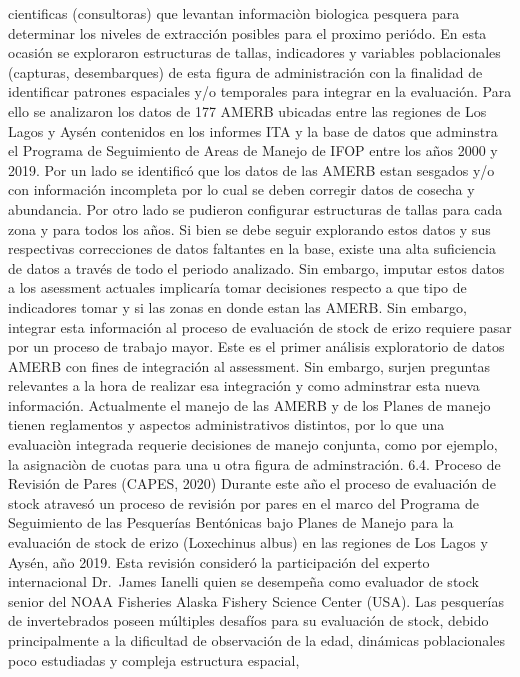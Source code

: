 \documentclass[
]{article}
\begin{document}
cientificas (consultoras) que levantan informaciòn biologica pesquera
para determinar los niveles de extracción posibles para el proximo
periódo. En esta ocasión se exploraron estructuras de tallas,
indicadores y variables poblacionales (capturas, desembarques) de esta
figura de administración con la finalidad de identificar patrones
espaciales y/o temporales para integrar en la evaluación. Para ello se
analizaron los datos de 177 AMERB ubicadas entre las regiones de Los
Lagos y Aysén contenidos en los informes ITA y la base de datos que
adminstra el Programa de Seguimiento de Areas de Manejo de IFOP entre
los años 2000 y 2019. Por un lado se identificó que los datos de las
AMERB estan sesgados y/o con información incompleta por lo cual se deben
corregir datos de cosecha y abundancia. Por otro lado se pudieron
configurar estructuras de tallas para cada zona y para todos los años.
Si bien se debe seguir explorando estos datos y sus respectivas
correcciones de datos faltantes en la base, existe una alta suficiencia
de datos a través de todo el periodo analizado. Sin embargo, imputar
estos datos a los asessment actuales implicaría tomar decisiones
respecto a que tipo de indicadores tomar y si las zonas en donde estan
las AMERB. Sin embargo, integrar esta información al proceso de
evaluación de stock de erizo requiere pasar por un proceso de trabajo
mayor. Este es el primer análisis exploratorio de datos AMERB con fines
de integración al assessment. Sin embargo, surjen preguntas relevantes a
la hora de realizar esa integración y como adminstrar esta nueva
información. Actualmente el manejo de las AMERB y de los Planes de
manejo tienen reglamentos y aspectos administrativos distintos, por lo
que una evaluaciòn integrada requerie decisiones de manejo conjunta,
como por ejemplo, la asignaciòn de cuotas para una u otra figura de
adminstración. 6.4. Proceso de Revisión de Pares (CAPES, 2020) Durante
este año el proceso de evaluación de stock atravesó un proceso de
revisión por pares en el marco del Programa de Seguimiento de las
Pesquerías Bentónicas bajo Planes de Manejo para la evaluación de stock
de erizo (Loxechinus albus) en las regiones de Los Lagos y Aysén, año
2019. Esta revisión consideró la participación del experto internacional
Dr.~James Ianelli quien se desempeña como evaluador de stock senior del
NOAA Fisheries Alaska Fishery Science Center (USA). Las pesquerías de
invertebrados poseen múltiples desafíos para su evaluación de stock,
debido principalmente a la dificultad de observación de la edad,
dinámicas poblacionales poco estudiadas y compleja estructura espacial,
\end{document}
